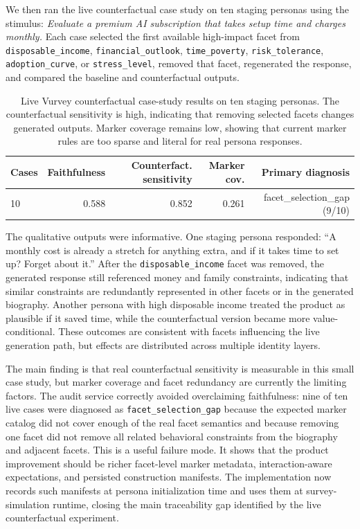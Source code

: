 \documentclass[10pt,a4paper]{article}
\begin{document}
We then ran the live counterfactual case study on ten staging personas using the stimulus: \emph{Evaluate a premium AI subscription that takes setup time and charges monthly.} Each case selected the first available high-impact facet from \texttt{disposable\_income}, \texttt{financial\_outlook}, \texttt{time\_poverty}, \texttt{risk\_tolerance}, \texttt{adoption\_curve}, or \texttt{stress\_level}, removed that facet, regenerated the response, and compared the baseline and counterfactual outputs.

\begin{table}[h]
\centering
\caption{Live Vurvey counterfactual case-study results on ten staging personas. The counterfactual sensitivity is high, indicating that removing selected facets changes generated outputs. Marker coverage remains low, showing that current marker rules are too sparse and literal for real persona responses.}
\label{tab:live-vurvey-counterfactuals}
\begin{tabular}{lrrrr}
\toprule
Cases & Faithfulness & Counterfact. sensitivity & Marker cov. & Primary diagnosis \\
\midrule
10 & 0.588 & 0.852 & 0.261 & facet\_selection\_gap (9/10) \\
\bottomrule
\end{tabular}
\end{table}

The qualitative outputs were informative. One staging persona responded: ``A monthly cost is already a stretch for anything extra, and if it takes time to set up? Forget about it.'' After the \texttt{disposable\_income} facet was removed, the generated response still referenced money and family constraints, indicating that similar constraints are redundantly represented in other facets or in the generated biography. Another persona with high disposable income treated the product as plausible if it saved time, while the counterfactual version became more value-conditional. These outcomes are consistent with facets influencing the live generation path, but effects are distributed across multiple identity layers.

The main finding is that real counterfactual sensitivity is measurable in this small case study, but marker coverage and facet redundancy are currently the limiting factors. The audit service correctly avoided overclaiming faithfulness: nine of ten live cases were diagnosed as \texttt{facet\_selection\_gap} because the expected marker catalog did not cover enough of the real facet semantics and because removing one facet did not remove all related behavioral constraints from the biography and adjacent facets. This is a useful failure mode. It shows that the product improvement should be richer facet-level marker metadata, interaction-aware expectations, and persisted construction manifests. The implementation now records such manifests at persona initialization time and uses them at survey-simulation runtime, closing the main traceability gap identified by the live counterfactual experiment.
\end{document}
